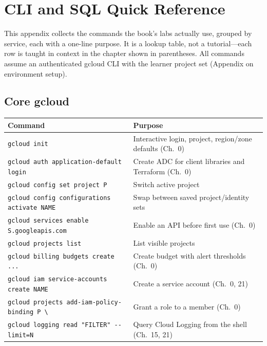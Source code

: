 \chapter{CLI and SQL Quick Reference}
%
This appendix collects the commands the book's labs actually use, grouped by service, each with a
one-line purpose. It is a lookup table, not a tutorial---each row is taught in context in the
chapter shown in parentheses. All commands assume an authenticated gcloud CLI with the learner
project set (Appendix on environment setup).

\section{Core gcloud}
\begin{center}
\footnotesize
\begin{tabular}{@{}p{6.6cm}p{6.2cm}@{}}
\toprule
\textbf{Command} & \textbf{Purpose} \\
\midrule
\texttt{gcloud init} & Interactive login, project, region/zone defaults (Ch.~0) \\
\texttt{gcloud auth application-default login} & Create ADC for client libraries and Terraform (Ch.~0) \\
\texttt{gcloud config set project P} & Switch active project \\
\texttt{gcloud config configurations activate NAME} & Swap between saved project/identity sets \\
\texttt{gcloud services enable S.googleapis.com} & Enable an API before first use (Ch.~0) \\
\texttt{gcloud projects list} & List visible projects \\
\texttt{gcloud billing budgets create ...} & Create budget with alert thresholds (Ch.~0) \\
\texttt{gcloud iam service-accounts create NAME} & Create a service account (Ch.~0, 21) \\
\texttt{gcloud projects add-iam-policy-binding P \textbackslash} & Grant a role to a member (Ch.~0) \\
\texttt{gcloud logging read "FILTER" -{}-limit=N} & Query Cloud Logging from the shell (Ch.~15, 21) \\
\bottomrule
\end{tabular}
\end{center}

